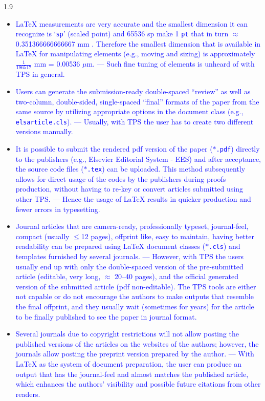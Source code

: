 \documentclass[phd]{ndsu-thesis-2022}
\newcommand\myspacing{1.9}      %
\newcommand\italk[1]{\textcolor{blue}{#1}}  %
\newcommand\lx{\LaTeX\xspace}
\newcommand\vb[1]{\textcolor{blue}{\texttt{#1}}}%
\begin{document}
\begin{spacing}{\myspacing}
\begin{itemize}[leftmargin=*, itemsep=0pt, parsep=3pt]
\item \italk{\lx measurements are very accurate and the smallest dimension it can recognize is `\vb{sp}' (scaled point) and 65536 sp make 1 \vb{pt} that in turn $\approx$ 0.351366666666667 mm \citep{Wikibook2016}. Therefore the smallest dimension that is available in \lx for manipulating elements (e.g., moving and sizing) is approximately $\frac{1}{186517}$ mm = 0.00536 $\mu$m. --- Such fine tuning of elements is unheard of with TPS in general.} 

\item \italk{Users can generate the submission-ready double-spaced ``review'' as well as two-column, double-sided, single-spaced ``final'' formats of the paper from the same source by utilizing appropriate options in the document class (e.g., \vb{elsarticle.cls}). --- Usually, with TPS the user has to create two different versions manually.}   

\item \italk{It is possible to submit the rendered pdf version of the paper ($\ast$\vb{.pdf}) directly to the publishers (e.g., Elsevier Editorial System - EES) and after acceptance, the source code files ($\ast$\vb{.tex}) can be uploaded.  This method subsequently allows for direct usage of the codes by the publishers during proofs production, without having to re-key or convert articles submitted using other TPS. --- Hence the usage of \lx results in quicker production and fewer errors in typesetting.}   

\item \italk{Journal articles that are camera-ready, professionally typeset, journal-feel, compact (usually $\le$12 pages), offprint like, easy to maintain, having better readability can be prepared using \lx document classes ($\ast$\vb{.cls}) and templates furnished by several journals. --- However, with TPS the users usually end up with only the double-spaced version of the pre-submitted article (editable, very long, $\approx$ 20--40 pages), and the official generated version of the submitted article (pdf non-editable). The TPS tools are either not capable or do not encourage the authors to make outputs that resemble the final offprint, and they usually wait (sometimes for years) for the article to be finally published to see the paper in journal format.}    

\item \italk{Several journals due to copyright restrictions will not allow posting the published versions of the articles on the websites of the authors; however, the journals allow posting the preprint version prepared by the author. --- With \lx as the system of document preparation, the user can produce an output that has the journal-feel and almost matches the published article, which enhances the authors' visibility and possible future citations from other readers.}  


\end{itemize}
\end{spacing}
\end{document}
